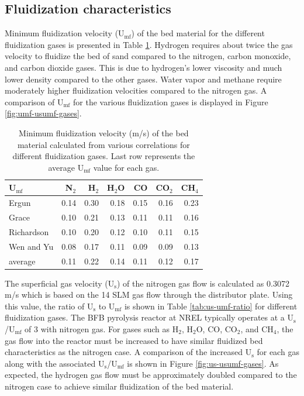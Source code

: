 \documentclass{article}
\begin{document}
\subsection{Fluidization characteristics}\label{sec:fluidization-charact}

Minimum fluidization velocity (U$_\text{mf}$) of the bed material for the different fluidization gases is presented in Table \ref{tab:umf-sand}. Hydrogen requires about twice the gas velocity to fluidize the bed of sand compared to the nitrogen, carbon monoxide, and carbon dioxide gases. This is due to hydrogen's lower viscosity and much lower density compared to the other gases. Water vapor and methane require moderately higher fluidization velocities compared to the nitrogen gas. A comparison of U$_\text{mf}$ for the various fluidization gases is displayed in Figure \ref{fig:umf-usumf-gases}.

\begin{table}[H]
    \centering
    \caption{Minimum fluidization velocity (m/s) of the bed material calculated from various correlations for different fluidization gases. Last row represents the average U$_\text{mf}$ value for each gas.}
    \label{tab:umf-sand}
    \begin{tabular}{lrrrrrr}
        \toprule
        U$_\text{mf}$ & N$_2$ & H$_2$ & H$_2$O & CO & CO$_2$ & CH$_4$ \\
        \midrule
        Ergun         & 0.14 & 0.30 & 0.18 & 0.15 & 0.16 & 0.23 \\
        Grace         & 0.10 & 0.21 & 0.13 & 0.11 & 0.11 & 0.16 \\
        Richardson    & 0.10 & 0.20 & 0.12 & 0.10 & 0.11 & 0.15 \\
        Wen and Yu    & 0.08 & 0.17 & 0.11 & 0.09 & 0.09 & 0.13 \\
        average       & 0.11 & 0.22 & 0.14 & 0.11 & 0.12 & 0.17 \\
        \bottomrule
    \end{tabular}
\end{table}

The superficial gas velocity (U$_\text{s}$) of the nitrogen gas flow is calculated as 0.3072 m/s which is based on the 14 SLM gas flow through the distributor plate. Using this value, the ratio of U$_\text{s}$ to U$_\text{mf}$ is shown in Table \ref{tab:us-umf-ratio} for different fluidization gases. The BFB pyrolysis reactor at NREL typically operates at a U$_\text{s}$/U$_\text{mf}$ of 3 with nitrogen gas. For gases such as H$_2$, H$_2$O, CO, CO$_2$, and CH$_4$, the gas flow into the reactor must be increased to have similar fluidized bed characteristics as the nitrogen case. A comparison of the increased U$_\text{s}$ for each gas along with the associated U$_\text{s}$/U$_\text{mf}$ is shown in Figure \ref{fig:us-usumf-gases}. As expected, the hydrogen gas flow must be approximately doubled compared to the nitrogen case to achieve similar fluidization of the bed material.
\end{document}
